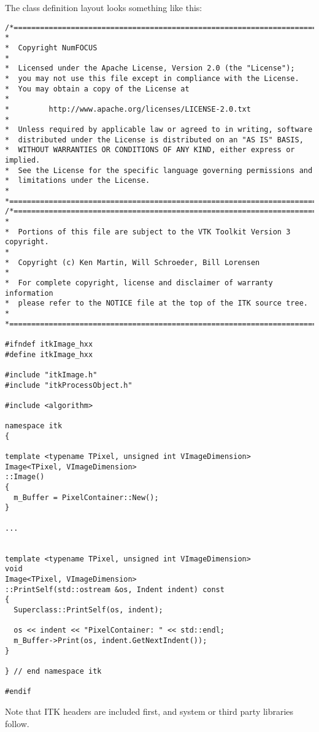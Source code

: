 The class definition layout looks something like this:

\small
\begin{verbatim}
/*=========================================================================
*
*  Copyright NumFOCUS
*
*  Licensed under the Apache License, Version 2.0 (the "License");
*  you may not use this file except in compliance with the License.
*  You may obtain a copy of the License at
*
*         http://www.apache.org/licenses/LICENSE-2.0.txt
*
*  Unless required by applicable law or agreed to in writing, software
*  distributed under the License is distributed on an "AS IS" BASIS,
*  WITHOUT WARRANTIES OR CONDITIONS OF ANY KIND, either express or implied.
*  See the License for the specific language governing permissions and
*  limitations under the License.
*
*=========================================================================*/
/*=========================================================================
*
*  Portions of this file are subject to the VTK Toolkit Version 3 copyright.
*
*  Copyright (c) Ken Martin, Will Schroeder, Bill Lorensen
*
*  For complete copyright, license and disclaimer of warranty information
*  please refer to the NOTICE file at the top of the ITK source tree.
*
*=========================================================================*/

#ifndef itkImage_hxx
#define itkImage_hxx

#include "itkImage.h"
#include "itkProcessObject.h"

#include <algorithm>

namespace itk
{

template <typename TPixel, unsigned int VImageDimension>
Image<TPixel, VImageDimension>
::Image()
{
  m_Buffer = PixelContainer::New();
}

...


template <typename TPixel, unsigned int VImageDimension>
void
Image<TPixel, VImageDimension>
::PrintSelf(std::ostream &os, Indent indent) const
{
  Superclass::PrintSelf(os, indent);

  os << indent << "PixelContainer: " << std::endl;
  m_Buffer->Print(os, indent.GetNextIndent());
}

} // end namespace itk

#endif
\end{verbatim}
\normalsize

Note that ITK headers are included first, and system or third party libraries
follow.


